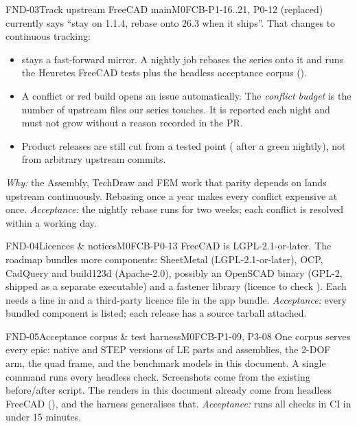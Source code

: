 \begin{epic}{FND-03}{Track upstream FreeCAD main}{M0}{\stTodo}{FCB-P1-16..21, P0-12 (replaced)}
 currently says ``stay on 1.1.4, rebase onto 26.3 when it ships''. That changes to
continuous tracking:
\begin{itemize}
  \item {} stays a fast-forward mirror. A nightly job rebases the \code{[BW]} series onto it
        and runs the Heuretes FreeCAD tests plus the headless acceptance corpus ().
  \item A conflict or red build opens an issue automatically. The \emph{conflict budget} is the number of
        upstream files our series touches. It is reported each night and must not grow without a reason
        recorded in the PR.
  \item Product releases are still cut from a tested point ( after a green nightly), not from
        arbitrary upstream commits.
\end{itemize}
\emph{Why:} the Assembly, TechDraw and FEM work that parity depends on lands upstream continuously.
Rebasing once a year makes every conflict expensive at once.
\emph{Acceptance:} the nightly rebase runs for two weeks; each conflict is resolved within a working day.
\end{epic}

\begin{epic}{FND-04}{Licences \& notices}{M0}{\stTodo}{FCB-P0-13}
FreeCAD is LGPL-2.1-or-later. The roadmap bundles more components: SheetMetal (LGPL-2.1-or-later), OCP, CadQuery and build123d
(Apache-2.0), possibly an OpenSCAD binary (GPL-2, shipped as a separate executable) and a fastener library
(licence to check \verify). Each needs a line in  and a third-party licence file in the app
bundle.
\emph{Acceptance:} every bundled component is listed; each release has a source tarball attached.
\end{epic}

\begin{epic}{FND-05}{Acceptance corpus \& test harness}{M0}{\stTodo}{FCB-P1-09, P3-08}
One corpus serves every epic: native and STEP versions of LE parts and assemblies, the 2-DOF arm, the quad
frame, and the benchmark models in this document. A single command runs every headless check.
Screenshots come from the existing before/after script. The renders in this document already come from
headless FreeCAD (), and the harness generalises that.
\emph{Acceptance:}  runs all checks in CI in under 15 minutes.
\end{epic}

